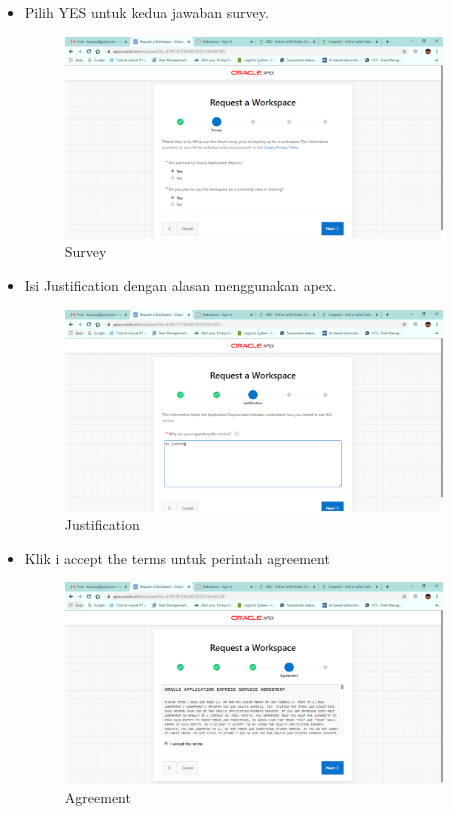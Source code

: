 \begin{itemize}
    \item Pilih YES untuk kedua jawaban survey.
    \begin{figure}[!htbp]
        \centering
        \includegraphics[width=10cm]{figures/work3.PNG}
        \caption{Survey}
    \end{figure}
    
    \item Isi Justification dengan alasan menggunakan apex.
    \begin{figure}[!htbp]
        \centering
        \includegraphics[width=10cm]{figures/work4.PNG}
        \caption{Justification}
    \end{figure}
    
    \newpage
    
    \item Klik i accept the terms untuk perintah agreement
    \begin{figure}[!htbp]
        \centering
        \includegraphics[width=10cm]{figures/work5.PNG}
        \caption{Agreement}
    \end{figure}
    

\end{itemize}
